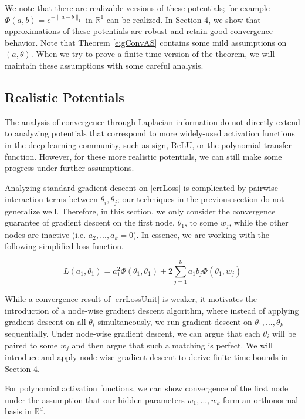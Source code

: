 \documentclass[11pt]{article}
\newcommand{\R}{{\mathbb{R}}}
\begin{document}
We note that there are realizable versions of these potentials; for example $\Phi(a,b) = e^{-\|a-b\|_1}$ in $\R^1$ can be realized. In Section 4, we show that approximations of these potentials are robust and retain good convergence behavior. Note that Theorem \ref{eigConvAS} contains some mild assumptions on $(a,\theta)$. When we try to prove a finite time version of the theorem, we will maintain these assumptions with some careful analysis. 



\subsection{Realistic Potentials}

The analysis of convergence through Laplacian information do not directly extend to analyzing potentials that correspond to more widely-used activation functions in the deep learning community, such as sign, ReLU, or the polynomial transfer function. However, for these more realistic potentials, we can still make some progress under further assumptions. 

Analyzing standard gradient descent on \eqref{errLoss} is complicated by pairwise interaction terms between $\theta_i, \theta_j$; our techniques in the previous section do not generalize well. Therefore, in this section, we only consider the convergence guarantee of gradient descent on the first node, $\theta_1$, to some $w_j$, while the other nodes are inactive (i.e. $a_2,...,a_k = 0$). In essence, we are working with the following simplified loss function.

\begin{equation}\label{errLossUnit}
L(a_1,\theta_1) =  a_1^2 \Phi(\theta_1,\theta_1)  + 2\sum_{j=1}^k a_1b_j \Phi(\theta_1,w_j)
\end{equation}

While a convergence result of \eqref{errLossUnit} is weaker, it motivates the introduction of a node-wise gradient descent algorithm, where instead of applying gradient descent on all $\theta_i$ simultaneously, we run gradient descent on $\theta_1,...,\theta_k$ sequentially. Under node-wise gradient descent, we can argue that each $\theta_i$ will be paired to some $w_j$ and then argue that such a matching is perfect. We will introduce and apply node-wise gradient descent to derive finite time bounds in Section 4.


For polynomial activation functions, we can show convergence of the first node under the assumption that our hidden parameters $w_1,...,w_k$ form an orthonormal basis in $\R^d$. 
\end{document}
